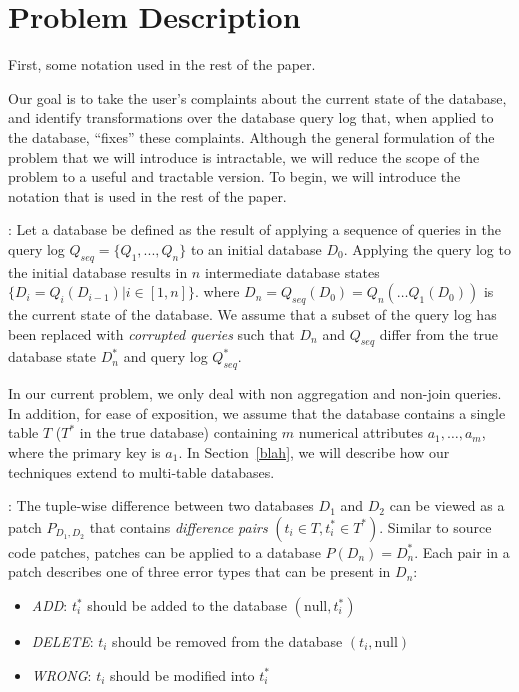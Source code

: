 \section{Problem Description}

First, some notation used in the rest of the paper.

Our goal is to take the user's complaints about the current state
of the database, and identify transformations over the database
query log that, when applied to the database, ``fixes'' these
complaints.  Although the general formulation of the problem that
we will introduce is intractable, we will reduce the scope of the
problem to a useful and tractable version.  To begin, we will
introduce the notation that is used in the rest of the paper.

: Let a database
be defined as the result of applying a sequence of queries in the query log
$Q_{seq}=\{Q_1,..., Q_n\}$ to an initial database $D_0$.  
Applying the query log to the initial database 
results in $n$ intermediate database states $\{D_i = Q_i(D_{i-1}) | i \in [1, n]\}$.  
where $D_n = Q_{seq}(D_0) = Q_n(\ldots Q_1(D_0))$ is the current state of the database. 
We assume that a subset of the query log has been replaced with {\it corrupted queries} 
such that $D_n$ and $Q_{seq}$ differ from the true database state $D^*_n$ and query log $Q^*_{seq}$.

In our current problem, we only deal with non aggregation and non-join queries.
In addition, for ease of exposition, we assume that the database contains a single table $T$ 
($T^*$ in the true database) containing $m$ numerical attributes $a_1,\ldots,a_m$, 
where the primary key is $a_1$.  
In Section~\ref{blah}, we will describe how our techniques extend to multi-table databases.



:
The tuple-wise difference between two databases $D_1$ and $D_2$ can be viewed as a patch
$P_{D_1, D_2}$ that contains {\it difference pairs} $(t_i \in T, t^*_i \in T^*)$.
Similar to source code patches, patches can be applied to a database $P(D_n) = D^*_n$.
Each pair in a patch describes one of three error types that can be present in $D_n$:

\begin{itemize}
\item {\it ADD}: $t^*_i$ should be added to the database $(\textrm{null}, t^*_i)$
\item {\it DELETE}: $t_i$ should be removed from the database $(t_i, \textrm{null})$
\item {\it WRONG}: $t_i$ should be modified into $t^*_i$
\end{itemize}


